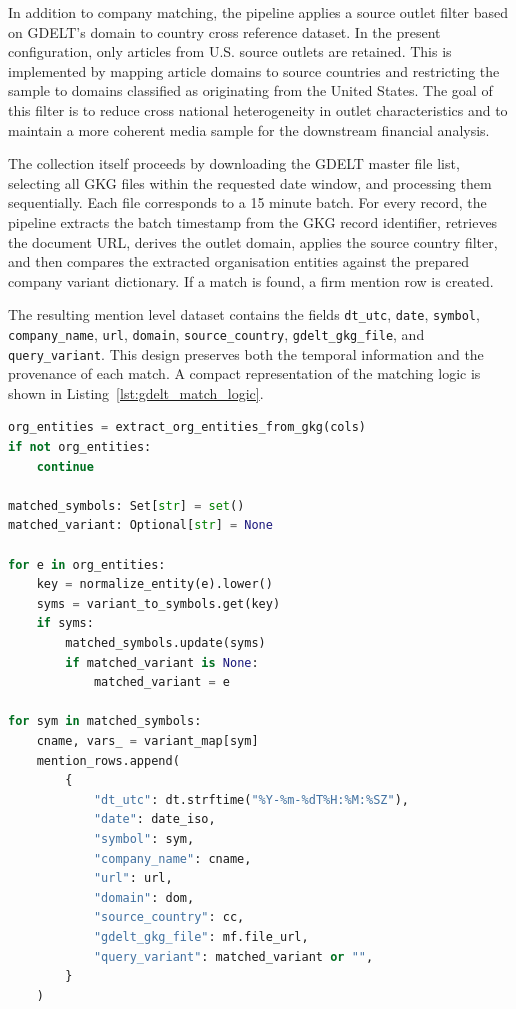 In addition to company matching, the pipeline applies a source outlet filter based on GDELT's domain to country cross reference dataset. In the present configuration, only articles from U.S. source outlets are retained. This is implemented by mapping article domains to source countries and restricting the sample to domains classified as originating from the United States. The goal of this filter is to reduce cross national heterogeneity in outlet characteristics and to maintain a more coherent media sample for the downstream financial analysis.

The collection itself proceeds by downloading the GDELT master file list, selecting all GKG files within the requested date window, and processing them sequentially. Each file corresponds to a 15 minute batch. For every record, the pipeline extracts the batch timestamp from the GKG record identifier, retrieves the document URL, derives the outlet domain, applies the source country filter, and then compares the extracted organisation entities against the prepared company variant dictionary. If a match is found, a firm mention row is created.

The resulting mention level dataset contains the fields \texttt{dt\_utc}, \texttt{date}, \texttt{symbol}, \texttt{company\_name}, \texttt{url}, \texttt{domain}, \texttt{source\_country}, \texttt{gdelt\_gkg\_file}, and \texttt{query\_variant}. This design preserves both the temporal information and the provenance of each match. A compact representation of the matching logic is shown in Listing~\ref{lst:gdelt_match_logic}.

\begin{lstlisting}[language=Python, caption={Matching GKG organisation entities to the firm universe}, label={lst:gdelt_match_logic}]
org_entities = extract_org_entities_from_gkg(cols)
if not org_entities:
    continue

matched_symbols: Set[str] = set()
matched_variant: Optional[str] = None

for e in org_entities:
    key = normalize_entity(e).lower()
    syms = variant_to_symbols.get(key)
    if syms:
        matched_symbols.update(syms)
        if matched_variant is None:
            matched_variant = e

for sym in matched_symbols:
    cname, vars_ = variant_map[sym]
    mention_rows.append(
        {
            "dt_utc": dt.strftime("%Y-%m-%dT%H:%M:%SZ"),
            "date": date_iso,
            "symbol": sym,
            "company_name": cname,
            "url": url,
            "domain": dom,
            "source_country": cc,
            "gdelt_gkg_file": mf.file_url,
            "query_variant": matched_variant or "",
        }
    )
\end{lstlisting}

